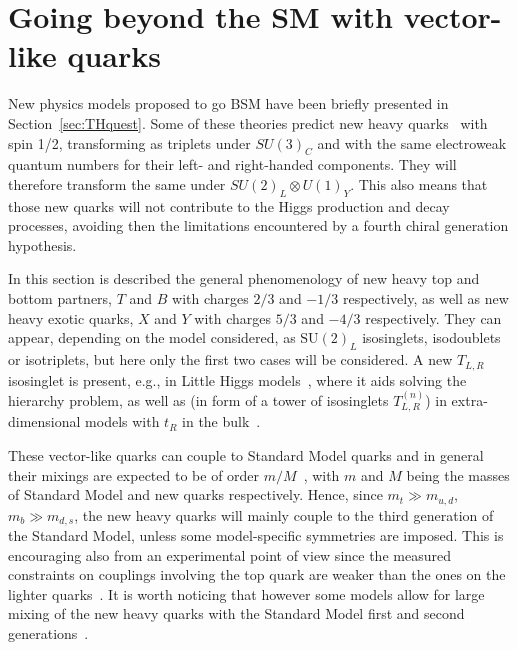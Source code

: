 
\section{Going beyond the SM with vector-like quarks}\label{sec:THvlq}

New physics models proposed to go BSM have been briefly presented in
Section~\ref{sec:THquest}. Some of these theories predict new heavy
quarks~\cite{AguilarSaavedra:2009es} %
with spin 1/2, transforming as triplets under $SU(3)_C$ and 
 with the same electroweak quantum numbers for their 
left- and right-handed components. They will
therefore transform the same under 
$SU(2)_L\otimes U(1)_Y$. 
This also means that those new quarks will not
contribute to the Higgs production and decay 
processes, avoiding then the
limitations encountered by a fourth chiral generation hypothesis.

In this section is described the general phenomenology of new heavy top and bottom
partners, $T$ and $B$ with charges $2/3$ and $-1/3$ respectively, as
well as new heavy exotic quarks, $X$ and $Y$ with charges $5/3$ and 
$-4/3$ respectively. They can appear, depending on the model considered,
as  $\text{SU}(2)_L$ isosinglets, isodoublets or isotriplets, but here
only the first two cases will be considered. 
A new $T_{L,R}$ isosinglet is present, e.g., in 
Little Higgs models~\cite{ArkaniHamed:2001nc,Perelstein:2005ka}, 
where it aids solving the hierarchy problem, as well
as (in form of a tower of isosinglets $T_{L,R}^{(n)}$) 
in extra-dimensional models with $t_R$ 
in the bulk~\cite{Csaki:2004ay}. 

These vector-like quarks can couple to Standard Model quarks and
in general their mixings are expected to be of order $m/M$~\cite{delAguila:1982fs},
 with $m$ and $M$ being
the masses of Standard Model and new quarks respectively.
Hence, since $m_t \gg m_{u,d}$, $m_b \gg m_{d,s}$,
the new heavy quarks will mainly couple to the third
generation of the Standard Model, unless some model-specific
symmetries are imposed.
This is encouraging also from an experimental point of view
since the measured constraints on couplings involving the
top quark are weaker than the ones on the lighter 
quarks~\cite{delAguila:1998tp,AguilarSaavedra:2002kr}.
It is worth noticing that however some models allow for 
large mixing of the new heavy quarks with the Standard Model
first and second generations~\cite{Atre:2008iu}.

